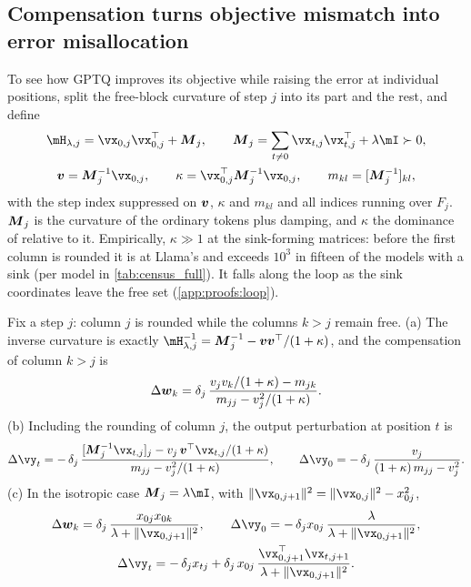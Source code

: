 \subsection{Compensation turns objective mismatch into error misallocation}
\label{sec:mechanism:rankone}
To see how GPTQ improves its objective while raising the error at individual positions, split the free-block curvature of step $j$ into its \bos{} part and the rest, and define
\begin{equation}
\label{eq:vkappa}
\begin{gathered}
\hess_{\lambda,j}=\vx_{0,j}\vx_{0,j}^\top+\mM_j,\qquad
\mM_j=\sum_{t\ne0}\vx_{t,j}\vx_{t,j}^\top+\lambda\mI\succ0,\\
\vv=\mM_j^{-1}\vx_{0,j},\qquad \kappa=\vx_{0,j}^\top\mM_j^{-1}\vx_{0,j},\qquad m_{kl}=[\mM_j^{-1}]_{kl},
\end{gathered}
\end{equation}
with the step index suppressed on $\boldsymbol{v}$, $\kappa$ and $m_{kl}$ and all indices running over $F_j$.
$\boldsymbol{M}_j$ is the curvature of the ordinary tokens plus damping, and $\kappa$ the dominance of \bos{} relative to it.
Empirically, $\kappa\gg1$ at the sink-forming matrices: before the first column is rounded it is \KappaMed{} at Llama's and exceeds $10^{3}$ in fifteen of the \nSinkStats{} models with a sink (per model in \cref{tab:census_full}). It falls along the loop as the sink coordinates leave the free set (\cref{app:proofs:loop}).
\begin{theorem}
\label{thm:rankone}
Fix a step $j$: column $j$ is rounded while the columns $k>j$ remain free.
(a) The inverse curvature is exactly $\hess_{\lambda,j}^{-1}=\mM_j^{-1}-\vv\vv^\top/(1+\kappa)$, and the compensation of column $k>j$ is
\begin{equation}
\label{eq:exact}
\Delta\boldsymbol{w}_k=\delta_j\,\frac{v_jv_k/(1+\kappa)-m_{jk}}{m_{jj}-v_j^2/(1+\kappa)} .
\end{equation}
(b) Including the rounding of column $j$, the output perturbation at position $t$ is
\begin{equation}
\label{eq:outgen}
\Delta\vy_t=-\,\delta_j\,\frac{[\mM_j^{-1}\vx_{t,j}]_j-v_j\,\vv^\top\vx_{t,j}/(1+\kappa)}{m_{jj}-v_j^2/(1+\kappa)},\qquad
\Delta\vy_0=-\,\delta_j\,\frac{v_j}{(1+\kappa)\,m_{jj}-v_j^2}.
\end{equation}
(c) In the isotropic case $\mM_j=\lambda\mI$, with $\|\vx_{0,j+1}\|^2=\|\vx_{0,j}\|^2-x_{0j}^2$,
\begin{equation}
\label{eq:iso}
\begin{gathered}
\Delta\vw_k=\delta_j\,\frac{x_{0j}x_{0k}}{\lambda+\|\vx_{0,j+1}\|^2},\qquad
\Delta\vy_0=-\,\delta_jx_{0j}\,\frac{\lambda}{\lambda+\|\vx_{0,j+1}\|^2},\\
\Delta\vy_t=-\,\delta_jx_{tj}+\delta_j\,x_{0j}\,\frac{\vx_{0,j+1}^\top\vx_{t,j+1}}{\lambda+\|\vx_{0,j+1}\|^2}.
\end{gathered}
\end{equation}
\end{theorem}


